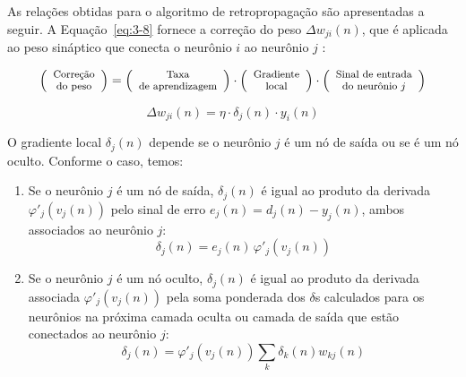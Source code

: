 As relações obtidas para o algoritmo de retropropagação são apresentadas a seguir. A Equação~\ref{eq:3-8} fornece a correção do peso $\Delta w_{ji}(n)$, que é aplicada ao peso sináptico que conecta o neurônio $i$ ao neurônio $j$ \cite{30}:

\begin{equation*}
\footnotesize
\left(
\begin{array}{c}
\text{Correção} \\
\text{do peso}
\end{array}
\right)
=
\left(
\begin{array}{c}
\text{Taxa} \\
\text{de aprendizagem}
\end{array}
\right)
\cdot
\left(
\begin{array}{c}
\text{Gradiente} \\
\text{local}
\end{array}
\right)
\cdot
\left(
\begin{array}{c}
\text{Sinal de entrada} \\
\text{do neurônio $j$}
\end{array}
\right)
\end{equation*}

\begin{equation}
\Delta w_{ji}(n) = \eta \cdot \delta_j(n) \cdot y_i(n)
\label{eq:3-8}
\end{equation}

O gradiente local $\delta_j(n)$ depende se o neurônio $j$ é um nó de saída ou se é um nó oculto. Conforme o caso, temos:

\begin{enumerate}[label=(\roman*)]
    \item Se o neurônio $j$ é um nó de saída, $\delta_j(n)$ é igual ao produto da derivada 
    $\varphi'_j(v_j(n))$ pelo sinal de erro $e_j(n)=d_j(n)-y_j(n)$, ambos associados ao neurônio $j$:
\begin{equation}
\delta_j(n) =  e_j(n)\,\varphi'_j(v_j(n))
\end{equation}

    \item Se o neurônio $j$ é um nó oculto, $\delta_j(n)$ é igual ao produto da derivada associada 
    $\varphi'_j(v_j(n))$ pela soma ponderada dos $\delta$s calculados para os neurônios na próxima camada 
    oculta ou camada de saída que estão conectados ao neurônio $j$:
\begin{equation}
\delta_j(n) = \varphi'_j(v_j(n)) \sum_{k} \delta_k(n) w_{kj}(n)
\end{equation}

\end{enumerate}


